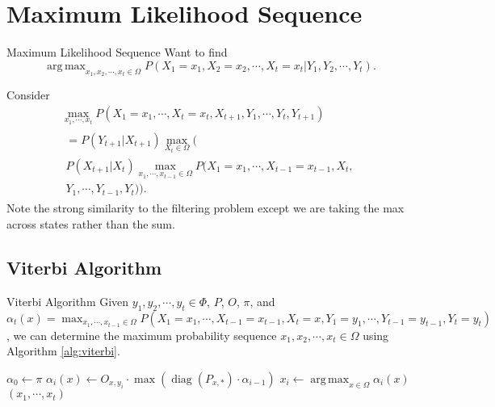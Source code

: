 \documentclass{beamer}
\DeclareMathOperator*{\argmax}{arg\,max}
\DeclareMathOperator{\diag}{diag}
\begin{document}
\section{Maximum Likelihood Sequence}
\begin{frame}{Maximum Likelihood Sequence}
Want to find 
\begin{equation}
\argmax_{x_1, x_2, \cdots, x_t \in \Omega} P(X_1 = x_1, X_2 = x_2, \cdots, X_t = x_t | Y_1, Y_2, \cdots, Y_t).
\end{equation}
\end{frame}

\begin{frame}
Consider
\begin{align}
&\max_{x_1, \cdots, x_t} P(X_1 = x_1, \cdots, X_t = x_t, X_{t+1}, Y_1, \cdots, Y_t, Y_{t+1})&\\
&\begin{multlined}
= P(Y_{t+1} | X_{t+1}) \max_{X_t \in \Omega}(\\
P(X_{t+1} | X_t) \max_{x_1, \cdots, x_{t-1} \in \Omega}P(X_1 = x_1, \cdots, X_{t-1} = x_{t-1}, X_t,\\
Y_1, \cdots, Y_{t-1}, Y_t)).
\end{multlined}
\end{align}
Note the strong similarity to the filtering problem except we are taking the max across states rather than the sum.
\end{frame}

\subsection{Viterbi Algorithm}
\begin{frame}{Viterbi Algorithm}
Given $y_1, y_2, \cdots, y_t \in \Phi$, $P$, $O$, $\pi$, and $\alpha_t(x) = \max_{x_1, \cdots, x_{t-1} \in \Omega}P(X_1 = x_1, \cdots, X_{t-1} = x_{t-1}, X_t = x, Y_1 = y_1, \cdots, Y_{t-1} = y_{t-1}, Y_t = y_t)$, we can determine the maximum probability sequence $x_1, x_2, \cdots, x_t \in \Omega$ using Algorithm \ref{alg:viterbi}.
\begin{algorithm}[H]
\caption{The Viterbi Algorithm}
\label{alg:viterbi}
\begin{algorithmic}
\STATE $\alpha_0 \leftarrow \pi$
\STATE $\alpha_i(x) \leftarrow O_{x,y_i} \cdot \max{\left( \diag(P_{x,*}) \cdot \alpha_{i-1} \right)}$
\ENDFOR
\STATE $x_i \leftarrow \argmax_{x \in \Omega}{\alpha_i(x)}$
\ENDFOR
\RETURN $(x_1, \cdots, x_t)$
\end{algorithmic}
\end{algorithm}
\end{frame}
\end{document}
